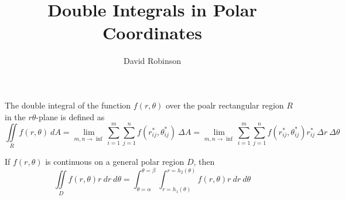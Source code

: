 \documentclass{article}
\title{Double Integrals in Polar Coordinates}
\author{David Robinson}
\date{}
\begin{document}
\maketitle

The double integral of the function $f(r,\theta)$ over the poalr rectangular region $R$ in the $r\theta$-plane is defined as
\[\iint\limits_R f(r,\theta)\: dA=\lim_{m,n\rightarrow\inf}\sum_{i=1}^m\sum_{j=1}^n f(r^*_{ij}, \theta^*_{ij})\:\Delta A=\lim_{m,n\rightarrow\inf}\sum_{i=1}^m\sum_{j=1}^n f(r^*_{ij}, \theta^*_{ij})r^*_{ij}\:\Delta r\:\Delta\theta\]

If $f(r,\theta)$ is continuous on a general polar region $D$, then
\[\iint\limits_D f(r,\theta)r\: dr\: d\theta=\int_{\theta=\alpha}^{\theta=\beta}\int_{r=h_1(\theta)}^{r=h_2(\theta)} f(r,\theta)r\: dr\: d\theta\]
\end{document}
